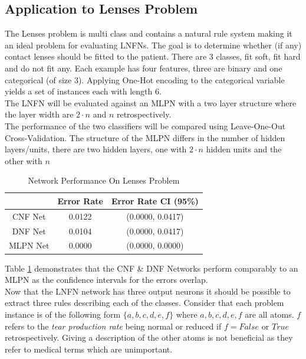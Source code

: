\subsection{Application to Lenses Problem}
The Lenses problem \cite{Lichman:2013} is multi class and contains a natural rule system making it an ideal problem for evaluating LNFNs. The goal is to determine whether (if any) contact lenses should be fitted to the patient. There are 3 classes, fit soft, fit hard and do not fit any. Each example has four features, three are binary and one categorical (of size 3). Applying One-Hot encoding to the categorical variable yields a set of instances each with length 6.\\

The LNFN will be evaluated against an MLPN with a two layer structure where the layer width are $2 \cdot n$ and $n$ retrospectively.\\

The performance of the two classifiers will be compared using Leave-One-Out Cross-Validation. The structure of the MLPN differs in the number of hidden layers/units, there are two hidden layers, one with $2 \cdot n$ hidden units and the other with $n$

\begin{table}[H]
	\begin{center}
		\begin{tabular}{| c | c | c |}
			\hline
			& Error Rate & Error Rate CI (95\%) \\
			\hline
			\hline
			CNF Net & 0.0122 & (0.0000, 0.0417) \\
			\hline
			DNF Net & 0.0104 & (0.0000, 0.0417) \\
			\hline
			MLPN Net & 0.0000 & (0.0000, 0.0000) \\
			\hline
		\end{tabular}
	\end{center}
	\caption{Network Performance On Lenses Problem}
	\label{tab:lenses-peformance-comp}
\end{table}

Table \ref{tab:lenses-peformance-comp} demonstrates that the CNF \& DNF Networks perform comparably to an MLPN as the confidence intervals for the errors overlap.\\ 

Now that the LNFN network has three output neurons it should be possible to extract three rules describing each of the classes. Consider that each problem instance is of the following form $\{a, b, c, d, e, f\}$ where $a,b,c,d,e,f$ are all atoms. $f$ refers to the \textit{tear production rate} being normal or reduced if $f = False$ or $True$ retrospectively. Giving a description of the other atoms is not beneficial as they refer to medical terms which are unimportant.\\

